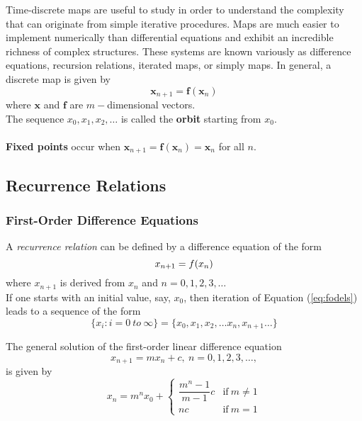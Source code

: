 Time-discrete maps are useful to study in order to understand the complexity that can originate from simple iterative procedures.
Maps are much easier to implement numerically than differential equations and exhibit an incredible richness of complex structures.
These systems are known variously as difference equations, recursion relations, iterated maps, or simply maps.
In general, a discrete map is given by
\begin{equation}
	\mathbf{x}_{n+1}=\mathbf{f}(\mathbf{x}_n)
\end{equation}
where $\mathbf{x}$ and $\mathbf{f}$ are $m-$dimensional vectors.\\
The sequence $x_0,x_1,x_2,\ldots$ is called the {\textbf{orbit}} starting from $x_0$.\\\\
\textbf{Fixed points} occur when $\mathbf{x}_{n+1}=\mathbf{f}(\mathbf{x}_n)=\mathbf{x}_n$ for all $n$.
\subsection{Recurrence Relations}
\subsubsection{First-Order Difference Equations}
A \emph{recurrence relation} can be defined by a difference equation of the form
\begin{equation}{\label{eq:fodels}}
	x_{n+1}=f(x_n)
\end{equation}
where $x_{n+1}$ is derived from $x_n$ and $n=0, 1, 2, 3,\ldots$\\
If one starts with an initial value, say, $x_0$, then iteration of Equation (\ref{eq:fodels}) leads to a sequence of the form
\begin{equation}
	\{x_i:i=0\ to\ \infty\}=\{x_0,x_1,x_2,\ldots x_n,x_{n+1}\ldots\}
\end{equation}
\begin{theorem}
	The general solution of the first-order linear difference equation
	\begin{equation}
		x_{n+1}=mx_n+c,\ n=0,1,2,3,\ldots,
	\end{equation}
	is given by
	\begin{equation}
		x_n=m^nx_0+
		\begin{cases}
			\dfrac{m^n-1}{m-1}c& \text{if}\ m\neq1\\
			nc& \text{if}\ m=1
		\end{cases}
	\end{equation}
\end{theorem}
